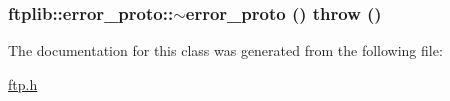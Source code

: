 \hypertarget{classftplib_1_1error__proto_3f80b3d7cb39a1725f917ae3383c75df}{
\subsubsection[{$\sim$error\_\-proto}]{\setlength{\rightskip}{0pt plus 5cm}ftplib::error\_\-proto::$\sim$error\_\-proto ()  throw ()}}
\label{classftplib_1_1error__proto_3f80b3d7cb39a1725f917ae3383c75df}




The documentation for this class was generated from the following file:\begin{CompactItemize}
\item 
\hyperlink{ftp_8h}{ftp.h}\end{CompactItemize}

